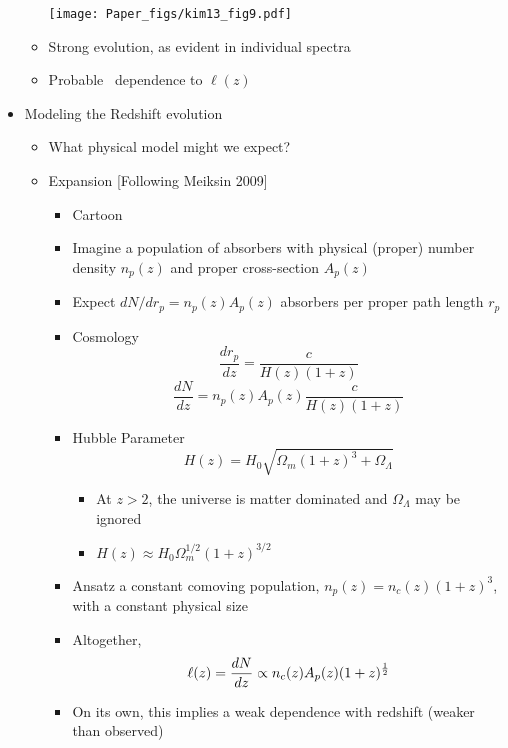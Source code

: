 \documentclass[12pt,letterpaper]{article}
\begin{document}
\begin{Aenumerate}
\begin{itemize}
\begin{itemize}
	\texttt{[image: Paper\_figs/kim13\_fig9.pdf]}

		\item Strong evolution, as evident in individual spectra
		\item Probable \nhi\ dependence to $\ell(z)$
		\end{itemize}

	\item Modeling the Redshift evolution
		\begin{itemize}
		\item What physical model might we expect?
		\item Expansion [Following Meiksin 2009]
			\begin{itemize}
			\item Cartoon
			\item Imagine a population of absorbers with physical (proper)
			number density $n_p(z)$ and proper cross-section $A_p(z)$
			\item Expect $dN/dr_p = n_p(z) A_p(z)$ absorbers per proper
			path length $r_p$
			\item Cosmology
			\begin{equation}
			\frac{dr_p}{dz} = \frac{c}{H(z) (1+z)}
			\label{eqn:drdz}
			\end{equation}
			\begin{equation}
			\frac{dN}{dz} = n_p(z) A_p(z) \frac{c}{H(z) (1+z)}
			\end{equation}
			\item Hubble Parameter
			\begin{equation}
			H(z) = H_0 \sqrt{\Omega_m (1+z)^3 + \Omega_\Lambda}
			\end{equation}
				\begin{itemize}
				\item At $z>2$, the universe is matter dominated and 
				$\Omega_\Lambda$ may be ignored
				\item $H(z) \approx H_0 \Omega_m^{1/2} (1+z)^{3/2}$
				\end{itemize}
			\item Ansatz a constant comoving
			population, $n_p(z) = n_c(z) (1+z)^{3}$, with a constant
			physical size
			\item Altogether,
			\begin{equation}
			\ell(z) = \frac{dN}{dz} \propto n_c(z) A_p(z) (1+z)^{\frac{1}{2}}
			\end{equation}
			\item On its own, this implies a weak dependence with redshift
			(weaker than observed)

\end{itemize}
\end{itemize}
\end{itemize}
\end{Aenumerate}
\end{document}
